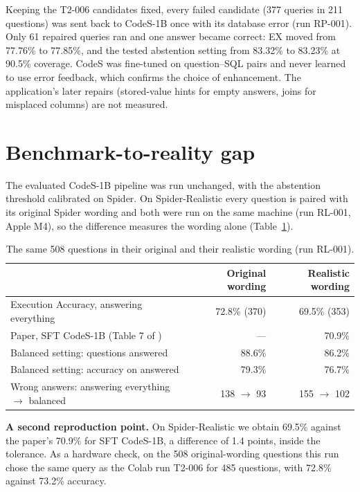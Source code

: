Keeping the T2-006 candidates fixed, every failed candidate (377 queries in 211 questions) was sent back to CodeS-1B once with its database error (run RP-001). Only 61 repaired queries ran and one answer became correct: EX moved from 77.76\% to 77.85\%, and the tested abstention setting from 83.32\% to 83.23\% at 90.5\% coverage. CodeS was fine-tuned on question--SQL pairs and never learned to use error feedback, which confirms the choice of enhancement. The application's later repairs (stored-value hints for empty answers, joins for misplaced columns) are not measured.

\section{Benchmark-to-reality gap}

The evaluated CodeS-1B pipeline was run unchanged, with the abstention threshold calibrated on Spider. On Spider-Realistic every question is paired with its original Spider wording and both were run on the same machine (run RL-001, Apple M4), so the difference measures the wording alone (Table~\ref{tab:real}).

\begin{table}[!t]
	\centering
	\caption{The same 508 questions in their original and their realistic wording (run RL-001).}
	\label{tab:real}
	\singlespacing
	\begin{tabular}{|l|r|r|}
		\hline
		 & \textbf{Original wording} & \textbf{Realistic wording} \\ \hline
		Execution Accuracy, answering everything & 72.8\% (370) & 69.5\% (353) \\ \hline
		Paper, SFT CodeS-1B (Table 7 of \cite{li2024codes}) & --- & 70.9\% \\ \hline
		Balanced setting: questions answered & 88.6\% & 86.2\% \\ \hline
		Balanced setting: accuracy on answered & 79.3\% & 76.7\% \\ \hline
		Wrong answers: answering everything $\rightarrow$ balanced & 138 $\rightarrow$ 93 & 155 $\rightarrow$ 102 \\ \hline
	\end{tabular}
\end{table}

\textbf{A second reproduction point.} On Spider-Realistic we obtain 69.5\% against the paper's 70.9\% for SFT CodeS-1B, a difference of 1.4 points, inside the tolerance. As a hardware check, on the 508 original-wording questions this run chose the same query as the Colab run T2-006 for 485 questions, with 72.8\% against 73.2\% accuracy.

